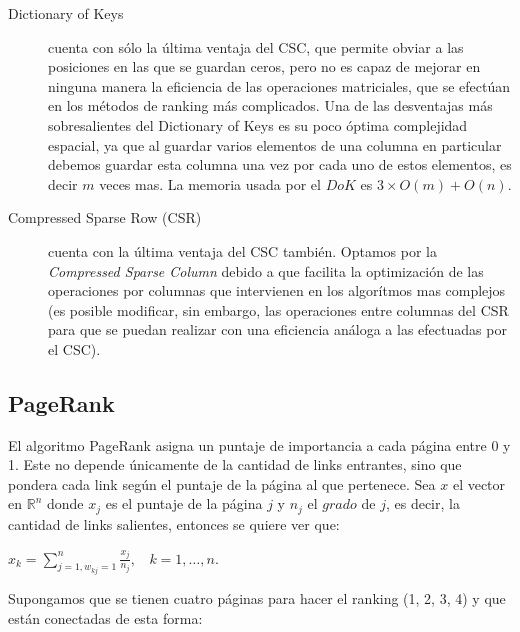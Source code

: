 \documentclass[a4paper]{article}
\begin{document}
\begin{description}


\item[Dictionary of Keys] cuenta con s\'{o}lo la \'{u}ltima ventaja del CSC, que permite obviar a las posiciones en las que se guardan ceros, pero no es capaz de mejorar en ninguna manera la eficiencia de las operaciones matriciales, que se efect\'{u}an en los m\'{e}todos de ranking m\'{a}s complicados.
Una de las desventajas m\'{a}s sobresalientes del Dictionary of Keys es su poco óptima complejidad espacial, ya que al guardar varios elementos de una columna en particular debemos guardar esta columna una vez por cada uno de estos elementos, es decir $m$ veces mas.
La memoria usada por el $DoK$ es $3 \times  O(m)+O(n)$. \\ 


\item[Compressed Sparse Row (CSR)] cuenta con la \'{u}ltima ventaja del CSC tambi\'{e}n.
Optamos por la \textit{Compressed Sparse Column} debido a que facilita la optimización de las operaciones por columnas que intervienen en los algorítmos mas complejos (es posible modificar, sin embargo, las operaciones entre columnas del CSR para que se puedan realizar con una eficiencia análoga a las efectuadas por el CSC).
 
\end{description}

\newpage

\subsection{PageRank}

El algoritmo PageRank asigna un puntaje de importancia a cada página entre 0 y 1. Este no depende únicamente de la cantidad de links entrantes, sino que pondera cada link según el puntaje de la página al que pertenece. Sea $x$ el vector en $\mathbb{R}^n$ donde $x_j$ es el puntaje de la página $j$ y $n_j$ el $grado$ de $j$, es decir, la cantidad de links salientes, entonces se quiere ver que:

$x_k = \sum_{j=1,w_{kj}=1}^{n} \frac{x_j}{n_j},~~~~k = 1,\dots,n.$

Supongamos que se tienen cuatro páginas para hacer el ranking (1, 2, 3, 4) y que están conectadas de esta forma:
\end{document}
